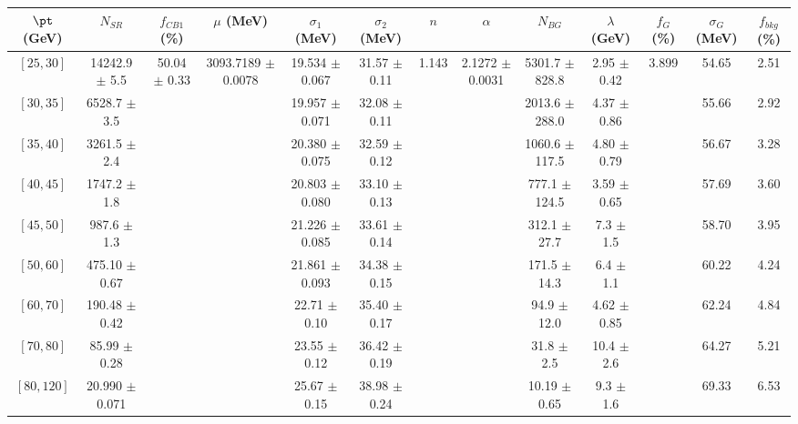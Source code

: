\begin{tabular}{c||c|c|c|c|c|c|c|c|c|c|c||c}
$\pt$ (GeV) & $N_{SR}$ & $f_{CB1}$ (\%) & $\mu$ (MeV) & $\sigma_1$ (MeV) & $\sigma_2$ (MeV) & $n$ & $\alpha$ & $N_{BG}$ & $\lambda$ (GeV) & $f_G$ (\%) & $\sigma_G$ (MeV) & $f_{bkg}$ (\%) \\
\hline
$[25, 30]$ & 14242.9 $\pm$ 5.5 & \multirow{9}{*}{50.04 $\pm$ 0.33} & \multirow{9}{*}{3093.7189 $\pm$ 0.0078} & 19.534 $\pm$ 0.067 & 31.57 $\pm$ 0.11 & \multirow{9}{*}{1.143} & \multirow{9}{*}{2.1272 $\pm$ 0.0031} & 5301.7 $\pm$ 828.8 & 2.95 $\pm$ 0.42 & \multirow{9}{*}{3.899} & 54.65 & 2.51\\
$[30, 35]$ & 6528.7 $\pm$ 3.5 &  &  & 19.957 $\pm$ 0.071 & 32.08 $\pm$ 0.11 &  &  & 2013.6 $\pm$ 288.0 & 4.37 $\pm$ 0.86 &  & 55.66 & 2.92\\
$[35, 40]$ & 3261.5 $\pm$ 2.4 &  &  & 20.380 $\pm$ 0.075 & 32.59 $\pm$ 0.12 &  &  & 1060.6 $\pm$ 117.5 & 4.80 $\pm$ 0.79 &  & 56.67 & 3.28\\
$[40, 45]$ & 1747.2 $\pm$ 1.8 &  &  & 20.803 $\pm$ 0.080 & 33.10 $\pm$ 0.13 &  &  & 777.1 $\pm$ 124.5 & 3.59 $\pm$ 0.65 &  & 57.69 & 3.60\\
$[45, 50]$ & 987.6 $\pm$ 1.3 &  &  & 21.226 $\pm$ 0.085 & 33.61 $\pm$ 0.14 &  &  & 312.1 $\pm$ 27.7 & 7.3 $\pm$ 1.5 &  & 58.70 & 3.95\\
$[50, 60]$ & 475.10 $\pm$ 0.67 &  &  & 21.861 $\pm$ 0.093 & 34.38 $\pm$ 0.15 &  &  & 171.5 $\pm$ 14.3 & 6.4 $\pm$ 1.1 &  & 60.22 & 4.24\\
$[60, 70]$ & 190.48 $\pm$ 0.42 &  &  & 22.71 $\pm$ 0.10 & 35.40 $\pm$ 0.17 &  &  & 94.9 $\pm$ 12.0 & 4.62 $\pm$ 0.85 &  & 62.24 & 4.84\\
$[70, 80]$ & 85.99 $\pm$ 0.28 &  &  & 23.55 $\pm$ 0.12 & 36.42 $\pm$ 0.19 &  &  & 31.8 $\pm$ 2.5 & 10.4 $\pm$ 2.6 &  & 64.27 & 5.21\\
$[80, 120]$ & 20.990 $\pm$ 0.071 &  &  & 25.67 $\pm$ 0.15 & 38.98 $\pm$ 0.24 &  &  & 10.19 $\pm$ 0.65 & 9.3 $\pm$ 1.6 &  & 69.33 & 6.53\\
\end{tabular}
